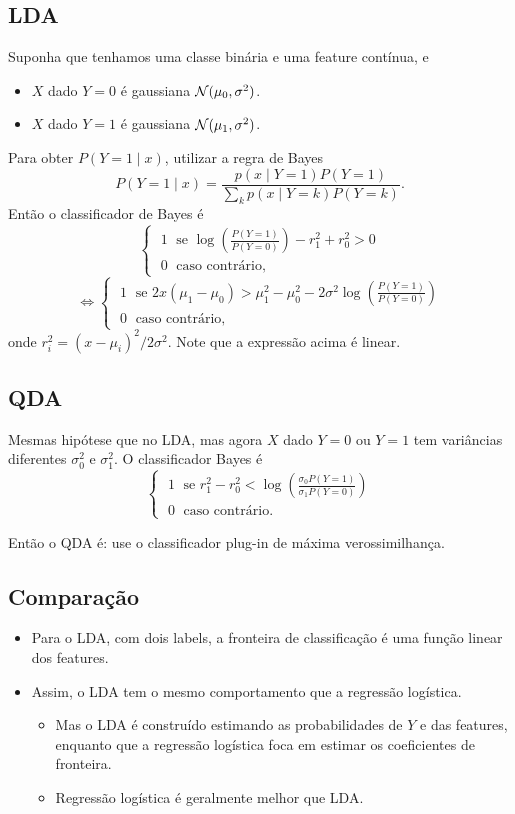 \documentclass[a4paper,fleqn,12pt]{article}
\begin{document}
\subsection{LDA}
Suponha que tenhamos uma classe binária e uma feature contínua, e
\begin{itemize}
\item $X$ dado $Y = 0$ é gaussiana $\mathcal{N}(\mu_0, \sigma^2)$.
\item $X$ dado $Y = 1$ é gaussiana $\mathcal{N}(\mu_1, \sigma^2)$.
\end{itemize}
Para obter $P(Y = 1 \mid x)$, utilizar a regra de Bayes
$$
P(Y = 1 \mid x) =
\frac{p(x \mid Y=1) P(Y=1)}{\sum_k p(x \mid Y=k) P(Y=k)}.
$$
Então o classificador de Bayes é
$$
\begin{cases}
\; 1 \; \text{ se } \log(\frac{P(Y=1)}{P(Y=0)}) - r_1^2 + r_0^2 > 0 \\
\; 0 \; \text{ caso contrário,}
\end{cases}
$$
$$
\iff
\begin{cases}
\; 1 \; \text{ se } 2x(\mu_1-\mu_0) > \mu_1^2 - \mu_0^2 - 2\sigma^2 \log(\frac{P(Y=1)}{P(Y=0)}) \\
\; 0 \; \text{ caso contrário,}
\end{cases}
$$
onde $r_i^2 = (x-\mu_i)^2/2\sigma^2$. Note que a expressão acima é linear.

\subsection{QDA}

Mesmas hipótese que no LDA, mas agora $X$ dado $Y=0$ ou $Y=1$ tem variâncias diferentes $\sigma_0^2$ e $\sigma_1^2$. O classificador Bayes é
$$
\begin{cases}
\; 1 \; \text{ se } r_1^2 - r_0^2 < \log(\frac{\sigma_0 P(Y=1)}{\sigma_1 P(Y=0)}) \\
\; 0 \; \text{ caso contrário.}
\end{cases}
$$

Então o QDA é: use o classificador plug-in de máxima verossimilhança.

\subsection{Comparação}

\begin{itemize}
\item Para o LDA, com dois labels, a fronteira de classificação é uma função linear dos features.
\item Assim, o LDA tem o mesmo comportamento que a regressão logística.
\begin{itemize}
\item Mas o LDA é construído estimando as probabilidades de $Y$ e das features, enquanto que a regressão logística foca em estimar os coeficientes de fronteira.
\item Regressão logística é geralmente melhor que LDA.
\end{itemize}
\end{itemize}
\end{document}
